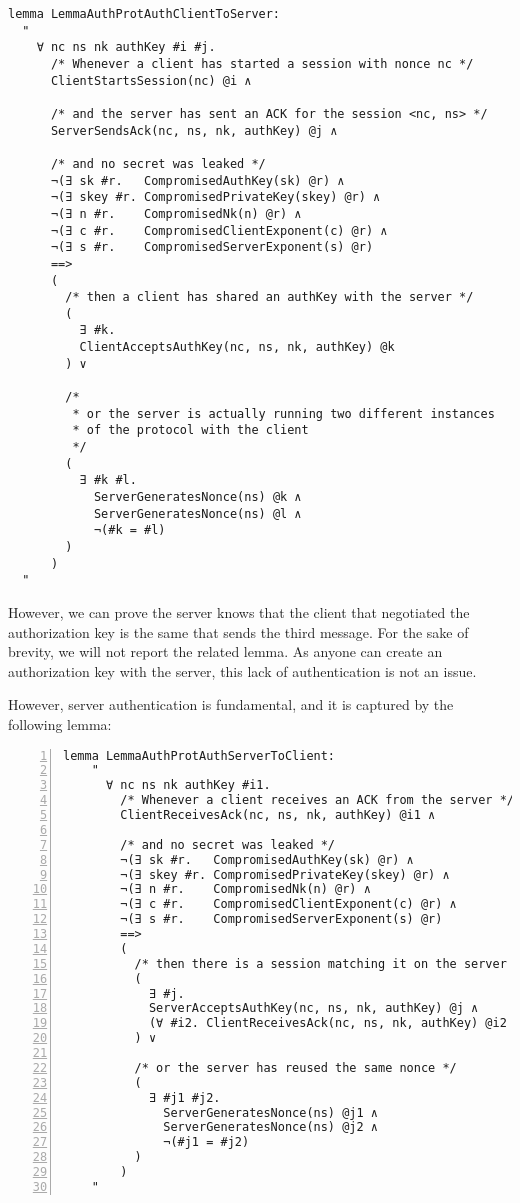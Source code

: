 \begin{lstlisting}
lemma LemmaAuthProtAuthClientToServer:
  "
    ∀ nc ns nk authKey #i #j.
      /* Whenever a client has started a session with nonce nc */
      ClientStartsSession(nc) @i ∧

      /* and the server has sent an ACK for the session <nc, ns> */
      ServerSendsAck(nc, ns, nk, authKey) @j ∧

      /* and no secret was leaked */          
      ¬(∃ sk #r.   CompromisedAuthKey(sk) @r) ∧
      ¬(∃ skey #r. CompromisedPrivateKey(skey) @r) ∧
      ¬(∃ n #r.    CompromisedNk(n) @r) ∧
      ¬(∃ c #r.    CompromisedClientExponent(c) @r) ∧
      ¬(∃ s #r.    CompromisedServerExponent(s) @r)
      ==>
      (
        /* then a client has shared an authKey with the server */
        (
          ∃ #k.
          ClientAcceptsAuthKey(nc, ns, nk, authKey) @k
        ) ∨

        /* 
         * or the server is actually running two different instances
         * of the protocol with the client
         */
        (
          ∃ #k #l.
            ServerGeneratesNonce(ns) @k ∧
            ServerGeneratesNonce(ns) @l ∧
            ¬(#k = #l)
        )
      )
  "
\end{lstlisting}

However, we can prove the server knows that the client that negotiated the authorization key is the same that sends the third message. For the sake of brevity, we will not report the related lemma. As anyone can create an authorization key with the server, this lack of authentication is not an issue.

However, server authentication is fundamental, and it is captured by the following lemma:
\begin{lstlisting}[numbers=left]
  lemma LemmaAuthProtAuthServerToClient:
    "
      ∀ nc ns nk authKey #i1.
        /* Whenever a client receives an ACK from the server */
        ClientReceivesAck(nc, ns, nk, authKey) @i1 ∧
        
        /* and no secret was leaked */
        ¬(∃ sk #r.   CompromisedAuthKey(sk) @r) ∧
        ¬(∃ skey #r. CompromisedPrivateKey(skey) @r) ∧
        ¬(∃ n #r.    CompromisedNk(n) @r) ∧
        ¬(∃ c #r.    CompromisedClientExponent(c) @r) ∧
        ¬(∃ s #r.    CompromisedServerExponent(s) @r)
        ==>
        (
          /* then there is a session matching it on the server */
          ( 
            ∃ #j.
            ServerAcceptsAuthKey(nc, ns, nk, authKey) @j ∧
            (∀ #i2. ClientReceivesAck(nc, ns, nk, authKey) @i2 ==> #i1 = #i2)
          ) ∨

          /* or the server has reused the same nonce */
          (
            ∃ #j1 #j2.
              ServerGeneratesNonce(ns) @j1 ∧
              ServerGeneratesNonce(ns) @j2 ∧
              ¬(#j1 = #j2)
          )
        )
    "
\end{lstlisting}

